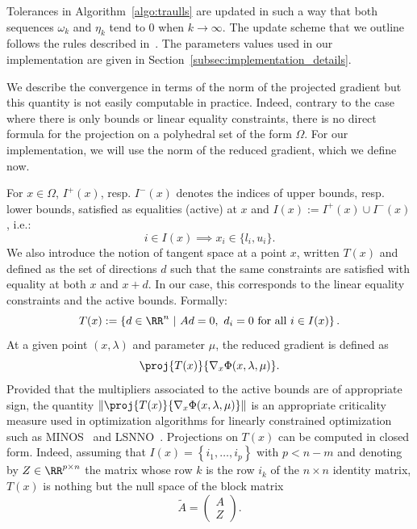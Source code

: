 Tolerances in Algorithm~\ref{algo:traulls} are updated in such a way that both sequences $\omega_k$ and $\eta_k$ tend to $0$ when $k \to \infty$. The update scheme that we outline follows the rules described in~\cite[][Chapter 14]{conn-etal:2000}. The parameters values used in our implementation are given in Section~\ref{subsec:implementation_details}.

We describe the convergence in terms of the norm of the projected gradient but this quantity is not easily computable in practice. Indeed, contrary to the case where there is only bounds or linear equality constraints, there is no direct formula for the projection on a polyhedral set of the form $\Omega$. For our implementation, we will use the norm of the reduced gradient, which we define now. 

For $x \in \Omega$, $I^+(x)$, resp. $I^-(x)$ denotes the indices of upper bounds, resp. lower bounds, satisfied as equalities (active) at $x$ and $I(x) := I^+(x) \cup I^-(x)$, i.e.:
\begin{equation*}
	i \in I(x) \implies x_i \in \{l_i,u_i\}.
\end{equation*}
We also introduce the notion of tangent space at a point $x$, written $T(x)$ and defined as the set of directions $d$ such that the same constraints are satisfied with equality at both $x$ and $x+d$. In our case, this corresponds to the linear equality constraints and the active bounds. Formally:
\begin{equation}\label{eq:tangent_space}
	T(x) := \left\{ d \in \RR^n \ | \ Ad = 0,\ d_i=0\ \text{for all}\ i\in I(x)\right\}.
\end{equation}
At a given point \((x,\lambda)\) and parameter $\mu$, the reduced gradient is defined as 
\begin{equation*}
	\proj{T(x)}{\nabla_x \Phi(x,\lambda,\mu)}.
\end{equation*}
Provided that the multipliers associated to the active bounds are of appropriate sign, the quantity $\|\proj{T(x)}{\nabla_x \Phi(x,\lambda,\mu)}\|$ is an appropriate criticality measure used in optimization algorithms for linearly constrained optimization such as MINOS~\cite{murtaghsaunders:1978} and LSNNO~\cite{tointtuyttens:1992}.
Projections on $T(x)$ can be computed in closed form. Indeed, assuming that $I(x) =  \left\{i_1,\ldots, i_p\right\}$ with $p < n-m$ and denoting by $Z \in \RR^{p\times n}$ the matrix whose row $k$ is the row $i_k$ of the $n\times n$ identity matrix, $T(x)$ is nothing but the null space of the block matrix 
\begin{equation}\label{eq:matrix_tangent_space}
	\tilde{A} = \begin{pmatrix}
	A \\Z
\end{pmatrix}.
\end{equation}

